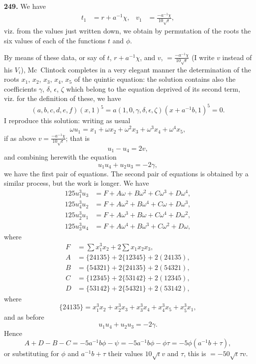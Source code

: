 \documentclass[11pt,a4paper]{book}
\begin{document}
\vspace{0.5em}

\noindent\textbf{249.} We have
\begin{align*}
t_1 &= r + a^{-1}\chi, & v_1 &= \frac{-a^{-1}\chi}{10\sqrt{\iota}},
\end{align*}
viz. from the values just written down, we obtain by permutation of the roots the six values of each of the functions $t$ and $\phi$.

By means of these data, or say of $t$, $r + a^{-1}\chi$, and $v$, $= \frac{-a^{-1}\chi}{10\sqrt{\iota}}$ (I write $v$ instead of his $V_i$), Mc~Clintock completes in a very elegant manner the determination of the roots $x_1$, $x_2$, $x_3$, $x_4$, $x_5$ of the quintic equation: the solution contains also the coefficients $\gamma$, $\delta$, $\epsilon$, $\zeta$ which belong to the equation deprived of its second term, viz. for the definition of these, we have
\[
(a, b, c, d, e, f)(x, 1)^5 = a(1, 0, \gamma, \delta, \epsilon, \zeta)(x + a^{-1}b, 1)^5 = 0.
\]
I reproduce this solution: writing as usual
\[
\omega u_1 = x_1 + \omega x_2 + \omega^2 x_3 + \omega^3 x_4 + \omega^4 x_5,
\]
if as above $v = \frac{-a^{-1}\chi}{10\sqrt{\iota}}$; that is
\[
u_1 - u_4 = 2v,\]
and combining herewith the equation
\[
u_1u_4 + u_2u_3 = -2\gamma,\]
we have the first pair of equations. The second pair of equations is obtained by a similar process, but the work is longer. We have
\begin{align*}
125 u_1^3u_3 &= F + A\omega + B\omega^2 + C\omega^3 + D\omega^4,\\
125 u_4^3u_2 &= F + A\omega^2 + B\omega^4 + C\omega + D\omega^3,\\
125 u_2^3u_1 &= F + A\omega^3 + B\omega + C\omega^4 + D\omega^2,\\
125 u_3^3u_4 &= F + A\omega^4 + B\omega^3 + C\omega^2 + D\omega,
\end{align*}
where
\begin{align*}
F &= \sum x_1^3x_2 + 2\sum x_1x_2x_3,\\
A &= \{24135\} + 2\{12345\} + 2(24135),\\
B &= \{54321\} + 2\{24135\} + 2(54321),\\
C &= \{12345\} + 2\{53142\} + 2(12345),\\
D &= \{53142\} + 2\{54321\} + 2(53142),
\end{align*}
where
\[
\{24135\} = x_1^3x_2 + x_2^3x_3 + x_3^3x_4 + x_4^3x_5 + x_5^3x_1,
\]
and as before
\[
u_1u_4 + u_2u_3 = -2\gamma.\]
Hence
\[
A + D - B - C = -5a^{-1}b\phi - \psi = -5a^{-1}b\phi - \phi\tau = -5\phi(a^{-1}b + \tau),
\]
or substituting for $\phi$ and $a^{-1}b + \tau$ their values $10\sqrt{\iota}v$ and $\tau$, this is $= -50\sqrt{\iota}\tau v$.
\end{document}
